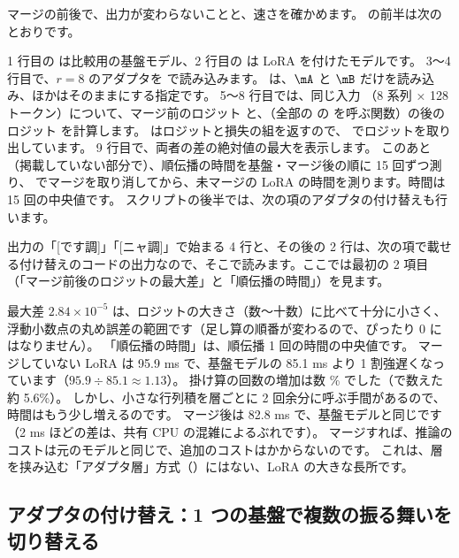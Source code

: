 マージの前後で、出力が変わらないことと、速さを確かめます。
 の前半は次のとおりです。


1 行目の  は比較用の基盤モデル、2 行目の  は LoRA を付けたモデルです。
3〜4 行目で、$r=8$ のアダプタを  で読み込みます。
 は、$\mA$ と $\mB$ だけを読み込み、ほかはそのままにする指定です。
5〜8 行目では、同じ入力 （8 系列 × 128 トークン）について、マージ前のロジット  と、（全部の  の  を呼ぶ関数）の後のロジット  を計算します。
 はロジットと損失の組を返すので、\code{[0]} でロジットを取り出しています。
9 行目で、両者の差の絶対値の最大を表示します。
このあと（掲載していない部分で）、順伝播の時間を基盤・マージ後の順に 15 回ずつ測り、 でマージを取り消してから、未マージの LoRA の時間を測ります。時間は 15 回の中央値です。
スクリプトの後半では、次の項のアダプタの付け替えも行います。


出力の「[です調]」「[ニャ調]」で始まる 4 行と、その後の 2 行は、次の項で載せる付け替えのコードの出力なので、そこで読みます。ここでは最初の 2 項目（「マージ前後のロジットの最大差」と「順伝播の時間」）を見ます。

最大差 $2.84\times10^{-5}$ は、ロジットの大きさ（数〜十数）に比べて十分に小さく、
浮動小数点の丸め誤差の範囲です（足し算の順番が変わるので、ぴったり 0 にはなりません）。
「順伝播の時間」は、順伝播 1 回の時間の中央値です。
マージしていない LoRA は 95.9 ms で、基盤モデルの 85.1 ms より 1 割強遅くなっています（$95.9\div85.1\approx1.13$）。
掛け算の回数の増加は数 \% でした（で数えた約 5.6\%）。
しかし、小さな行列積を層ごとに 2 回余分に呼ぶ手間があるので、時間はもう少し増えるのです。
マージ後は 82.8 ms で、基盤モデルと同じです（2 ms ほどの差は、共有 CPU の混雑によるぶれです）。
マージすれば、推論のコストは元のモデルと同じで、追加のコストはかからないのです。
これは、層を挟み込む「アダプタ層」方式（）にはない、LoRA の大きな長所です。

\subsection{アダプタの付け替え：1 つの基盤で複数の振る舞いを切り替える}\label{sec:lora-swap}

